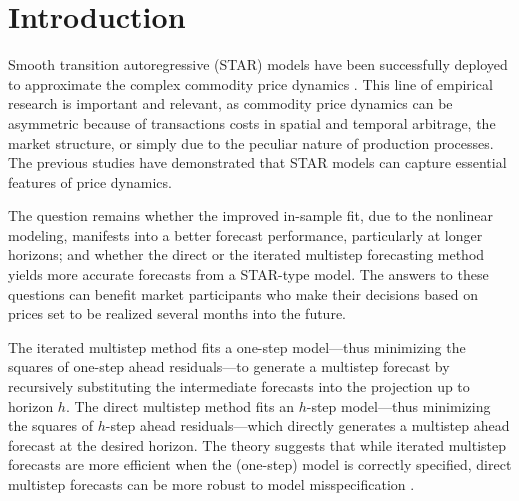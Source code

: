 \documentclass[11pt]{article}
\begin{document}
\doublespacing

\section{Introduction}

Smooth transition autoregressive (STAR) models have been successfully deployed to approximate the complex commodity price dynamics \citep[e.g.,][]{holt2006ajae,balagtas2009,enders2012,hood2015,ubilava2018}. This line of empirical research is important and relevant, as commodity price dynamics can be asymmetric because of transactions costs in spatial and temporal arbitrage, the market structure, or simply due to the peculiar nature of production processes. The previous studies have demonstrated that STAR models can capture essential features of price dynamics. 

The question remains whether the improved in-sample fit, due to the nonlinear modeling, manifests into a better forecast performance, particularly at longer horizons; and whether the direct or the iterated multistep forecasting method yields more accurate forecasts from a STAR-type model. The answers to these questions can benefit market participants who make their decisions based on prices set to be realized several months into the future. 



The iterated multistep method fits a one-step model---thus minimizing the squares of one-step ahead residuals---to generate a multistep forecast by recursively substituting the intermediate forecasts into the projection up to horizon $h$. The direct multistep method fits an $h$-step model---thus minimizing the squares of $h$-step ahead residuals---which directly generates a multistep ahead forecast at the desired horizon. The theory suggests that while iterated multistep forecasts are more efficient when the (one-step) model is correctly specified, direct multistep forecasts can be more robust to model misspecification \citep{weiss1991,stock1998}. 
\end{document}
